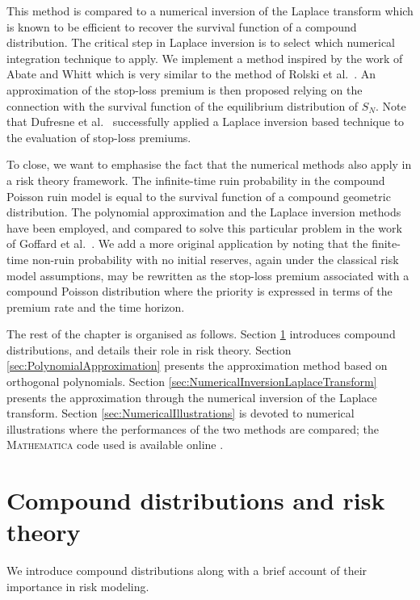 This method is compared to a numerical inversion of the Laplace transform which is known to be efficient to recover the survival function of a compound distribution. The critical step in Laplace inversion is to select which numerical integration technique to apply. We implement a method inspired by the work of Abate and Whitt \cite{Abate1992} which is very similar to the method of Rolski et al.\ \cite[Chapter 5, Section 5]{RoScScTe08}. An approximation of the stop-loss premium is then proposed relying on the connection with the survival function of the equilibrium distribution of $S_N$. Note that Dufresne et al.\ \cite{DuGaMo09} successfully applied a Laplace inversion based technique to the evaluation of stop-loss premiums.

To close, we want to emphasise the fact that the numerical methods also apply in a risk theory framework. The infinite-time ruin probability in the compound Poisson ruin model is equal to the survival function of a compound geometric distribution. The polynomial approximation and the Laplace inversion methods have been employed, and compared to solve this particular problem in the work of Goffard et al.\ \cite{GoLoPo16}. We add a more original application by noting that the finite-time non-ruin probability with no initial reserves, again under the classical risk model assumptions, may be rewritten as the stop-loss premium associated with a compound Poisson distribution where the priority is expressed in terms of the premium rate and the time horizon.

The rest of the chapter is organised as follows. Section \ref{sec:Preliminaries} introduces compound distributions, and details their role in risk theory. Section \ref{sec:PolynomialApproximation} presents the approximation method based on orthogonal polynomials. Section \ref{sec:NumericalInversionLaplaceTransform} presents the approximation through the numerical inversion of the Laplace transform. Section \ref{sec:NumericalIllustrations} is devoted to numerical illustrations where the performances of the two methods are compared; the \textsc{Mathematica} code used is available online \cite{StoplossCode}.

\section{Compound distributions and risk theory}\label{sec:Preliminaries}

We introduce compound distributions along with a brief account of their importance in risk modeling.

